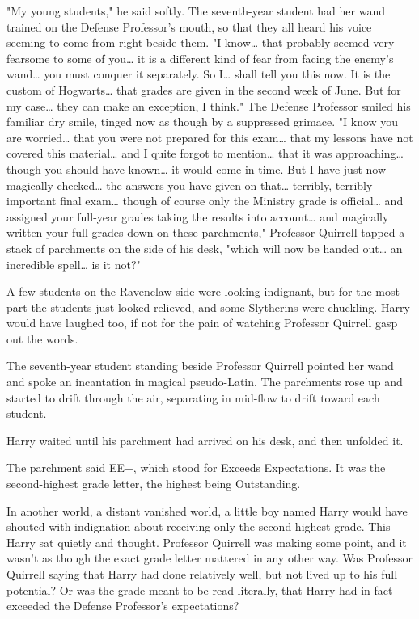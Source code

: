 "My young students," he said softly. The seventh-year student had her wand trained on the Defense Professor's mouth, so that they all heard his voice seeming to come from right beside them. "I know{\ldots} that probably seemed very fearsome to some of you{\ldots} it is a different kind of fear from facing the enemy's wand{\ldots} you must conquer it separately. So I{\ldots} shall tell you this now. It is the custom of Hogwarts{\ldots} that grades are given in the second week of June. But for my case{\ldots} they can make an exception, I think." The Defense Professor smiled his familiar dry smile, tinged now as though by a suppressed grimace. "I know you are worried{\ldots} that you were not prepared for this exam{\ldots} that my lessons have not covered this material{\ldots} and I quite forgot to mention{\ldots} that it was approaching{\ldots} though you should have known{\ldots} it would come in time. But I have just now magically checked{\ldots} the answers you have given on that{\ldots} terribly, terribly important final exam{\ldots} though of course only the Ministry grade is official{\ldots} and assigned your full-year grades taking the results into account{\ldots} and magically written your full grades down on these parchments," Professor Quirrell tapped a stack of parchments on the side of his desk, "which will now be handed out{\ldots} an incredible spell{\ldots} is it not?"

A few students on the Ravenclaw side were looking indignant, but for the most part the students just looked relieved, and some Slytherins were chuckling. Harry would have laughed too, if not for the pain of watching Professor Quirrell gasp out the words.

The seventh-year student standing beside Professor Quirrell pointed her wand and spoke an incantation in magical pseudo-Latin. The parchments rose up and started to drift through the air, separating in mid-flow to drift toward each student.

Harry waited until his parchment had arrived on his desk, and then unfolded it.

The parchment said EE+, which stood for Exceeds Expectations. It was the second-highest grade letter, the highest being Outstanding.

In another world, a distant vanished world, a little boy named Harry would have shouted with indignation about receiving only the second-highest grade. This Harry sat quietly and thought. Professor Quirrell was making some point, and it wasn't as though the exact grade letter mattered in any other way. Was Professor Quirrell saying that Harry had done relatively well, but not lived up to his full potential? Or was the grade meant to be read literally, that Harry had in fact exceeded the Defense Professor's expectations?

